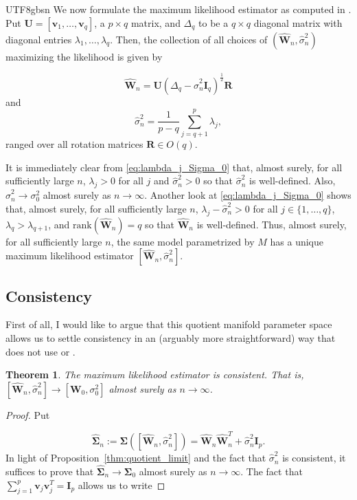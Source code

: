 \documentclass[12pt]{report}
\newcommand{\bracket}[1]{\left ( #1 \right )}
\newcommand{\squared}[1]{\left [ #1 \right ]}
\theoremstyle{plain}
\newtheorem{theorem}{Theorem}
\theoremstyle{definition}
\begin{document}
\begin{CJK*}{UTF8}{gbsn}
We now formulate the maximum likelihood estimator as 
computed 
in \cite{Tipping_Bishop_1999}.
Put $\bm{U} = [\bm{v}_1, \ldots, \bm{v}_q]$, a $p \times q$ matrix, and 
$\Delta_q$ to be a $q \times q$ diagonal matrix with diagonal entries $\lambda_1,
\ldots, \lambda_q$.
Then, the collection of all choices 
of $(\hat{\bm{W}}_n, \hat{\sigma}_n^2)$ maximizing the likelihood 
is given by

\begin{equation}\label{eq:W_hat_def}
  \hat{\bm{W}}_n = \bm{U} \bracket{\Delta_q - \hat{\sigma}_n^2\bm{I}_q}^{\frac{1}{2}}\bm{R}
\end{equation}
and 
\begin{equation}\label{eq:sigma_hat_def}
  \hat{\sigma}_n^2 = \frac{1}{p-q} \sum_{j=q+1}^p\lambda_j,
\end{equation}
ranged over all rotation matrices $\bm{R} \in O(q)$.

It is immediately clear from \eqref{eq:lambda_j_Sigma_0}
that, almost surely, for all sufficiently large $n$,
$\lambda_j > 0$ for all $j$ and $\hat{\sigma}_n^2 > 0$
so that $\hat{\sigma}_n^2$ is well-defined.
Also, $\hat{\sigma}_n^2 \to \sigma_0^2$
almost surely as $n \to \infty$.
Another look at \eqref{eq:lambda_j_Sigma_0}
shows that, almost surely, for all sufficiently large $n$, 
$\lambda_j - \hat{\sigma}_n^2 > 0$
for all $j \in \{1, \ldots, q\}$,
$\lambda_q > \lambda_{q+1}$,
and $\text{rank}(\hat{\bm{W}}_n) = q$
so that $\hat{\bm{W}}_n$ is well-defined.
Thus, almost surely, for all sufficiently large $n$, 
the same model parametrized by $M$
has a unique maximum likelihood estimator 
$\squared{\hat{\bm{W}}_n,\hat{\sigma}_n^2}$.

\subsection{Consistency}
First of all, I would like to argue that 
this quotient manifold parameter space allows 
us to settle consistency in an (arguably more straightforward) 
way that does not use
\cite{Datta_Chakrabarty_2023}
or \cite{Redner_1981}.

\begin{theorem}\label{thm:consistency}
The maximum likelihood estimator is consistent.
That is,
$\squared{\hat{\bm{W}}_n,\hat{\sigma}_n^2} \to \squared{\bm{W}_0,\sigma_0^2}$
almost surely as $n \to \infty$.
\end{theorem}
\begin{proof}
Put

\begin{equation}\label{eq:Sigma_hat_def}
  \hat{\bm{\Sigma}}_n := \bm{\Sigma}\bracket{ \squared{\hat{\bm{W}}_n,\hat{\sigma}_n^2}}
  = \hat{\bm{W}}_n\hat{\bm{W}}_n^T + \hat{\sigma}_n^2\bm{I}_p.
\end{equation}
In light of 
Proposition~\ref{thm:quotient_limit}
and the fact that $\hat{\sigma}_n^2$ is consistent,
it suffices to prove that 
$\hat{\bm{\Sigma}}_n \to \bm{\Sigma}_0$
almost surely as $n \to \infty$.
The fact that $\sum_{j=1}^p \bm{v}_j\bm{v}_j^T = \bm{I}_p$
allows us to write


\end{proof}
\end{CJK*}
\end{document}
